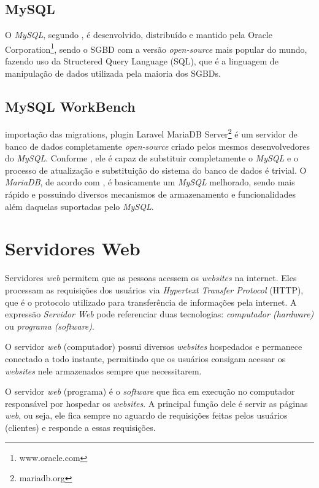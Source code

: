 \documentclass[
  12pt,       %
  openright,      %
  oneside,      %
  a4paper,      %
  english,      %
  french,        %
  spanish,     %
  brazil        %
  ]{abntex2-decsi}
\begin{document}
   \subsection{MySQL}
      
      O \textit{MySQL}, segundo , é desenvolvido, distribuído e mantido pela Oracle Corporation\footnote{www.oracle.com}, sendo o SGBD com a versão \textit{open-source} mais popular do mundo, fazendo uso da Structered Query Language (SQL), que é a linguagem de manipulação de dados utilizada pela maioria dos SGBDs.
      
      \subsection{MySQL WorkBench}
      importação das migrations, plugin Laravel
      MariaDB Server\footnote{mariadb.org} é um servidor de banco de dados completamente \textit{open-source} criado pelos mesmos desenvolvedores do \textit{MySQL}. Conforme , ele é capaz de substituir completamente o \textit{MySQL} e o processo de atualização e substituição do sistema do banco de dados é trivial. O \textit{MariaDB}, de acordo com , é basicamente um \textit{MySQL} melhorado, sendo mais rápido e possuindo diversos mecanismos de armazenamento e funcionalidades além daquelas suportadas pelo \textit{MySQL}.
      
    \section{Servidores Web}

        Servidores \textit{web} permitem que as pessoas acessem os \textit{websites} na internet. Eles processam as requisições dos usuários via \textit{Hypertext Transfer Protocol} (HTTP), que é o protocolo utilizado para transferência de informações pela internet. A expressão \textit{Servidor Web} pode referenciar duas tecnologias: \textit{computador (hardware)} ou \textit{programa (software)}. 

        O servidor \textit{web} (computador) possui diversos \textit{websites} hospedados e permanece conectado a todo instante, permitindo que os usuários consigam acessar os \textit{websites} nele armazenados sempre que necessitarem.  

        O servidor \textit{web} (programa) é o \textit{software} que fica em execução no computador responsável por hospedar os \textit{websites}. A principal função dele é servir as páginas \textit{web}, ou seja, ele fica sempre no aguardo de requisições feitas pelos usuários (clientes) e responde a essas requisições.
\end{document}
